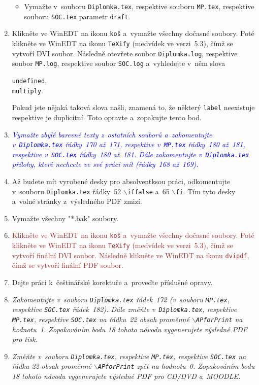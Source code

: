 \begin{enumerate}
\begin{itemize}
        \item Vymažte v~souboru \texttt{Diplomka.tex}, respektive souboru \texttt{MP.tex}, respektive souboru \texttt{SOC.tex} parametr \verb"draft".
    \end{itemize}
    \item Klikněte ve WinEDT na ikonu \verb"koš" a~vymažte všechny dočasné soubory. Poté klik\-ně\-te ve WinEDT na ikonu \verb"TeXify" (medvídek ve verzi~5.3), čímž se vytvoří  DVI soubor. Následně otevřete soubor \verb"Diplomka.log", respektive soubor \texttt{MP.log}, respektive soubor \texttt{SOC.log} a~vyhledejte v~něm slova
        \begin{center}
            \verb"undefined",\\
            \verb"multiply".
        \end{center}
        Pokud jste nějaká taková slova našli, znamená to, že některý \verb"label" neexistuje respektive je duplicitní. Toto opravte a~zopakujte tento bod.
    \item \textcolor{blue}{\em Vymažte zbylé barevné texty z~ostatních souborů a~zakomentujte v~\texttt{Diplomka.tex} řádky~170 až~171, respektive v~\texttt{MP.tex} řádky~180 až~181, respektive v~\texttt{SOC.tex} řádky~180 až~181. Dále zakomentujte v~\texttt{Diplomka.tex} přílohy, které nechcete ve své práci mít (řádky~168 až~169).}
    \item Až budete mít vyrobené desky pro absolventksou práci, odkomentujte v~souboru {\rm \texttt{Diplomka.tex}} řádky~52 {\rm $\backslash$\texttt{iffalse}} a~65 {\rm $\backslash$\texttt{fi}}. Tím tyto desky a~volné stránky z~výsledného PDF zmizí.
    \item Vymažte všechny "*.bak" soubory.
    \item \textcolor{brown}{Klikněte ve WinEDT na ikonu {\rm \texttt{koš}} a~vymažte všechny dočasné soubory. Poté klik\-ně\-te ve WinEDT na ikonu {\rm \texttt{TeXify}} (medvídek ve verzi~5.3), čímž se vytvoří finální DVI soubor. Následně klikněte ve WinEDT na ikonu {\rm \texttt{dvipdf}}, čímž se vytvoří finální PDF soubor.}
    \item Dejte práci k~češtinářské korektuře a~proveďte příslušné opravy.
    \item \textcolor{dgreen}{\em Zakomentujte v~souboru \texttt{Diplomka.tex} řádek~172 (v~souboru \texttt{MP.tex}, respektive \texttt{SOC.tex} řá\-dek~182). Dále změňte v~\texttt{Diplomka.tex}, respektive \texttt{MP.tex}, respektive \texttt{SOC.tex} na řádku~22 obsah proměnné \texttt{$\backslash$APforPrint} na hodnotu~1. Zopakováním bodu 18 tohoto návodu vygenerujete výsledné PDF pro tisk.}
    \item \textcolor{dgreen}{\em Změňte v~souboru \texttt{Diplomka.tex}, respektive \texttt{MP.tex}, respektive \texttt{SOC.tex} na řádku 22 obsah pro\-měn\-né \texttt{$\backslash$APforPrint} zpět na hodnotu~0. Zopakováním bodu 18 tohoto návodu vygenerujete výsledné PDF pro CD/DVD a~MOODLE.}
\end{enumerate}


